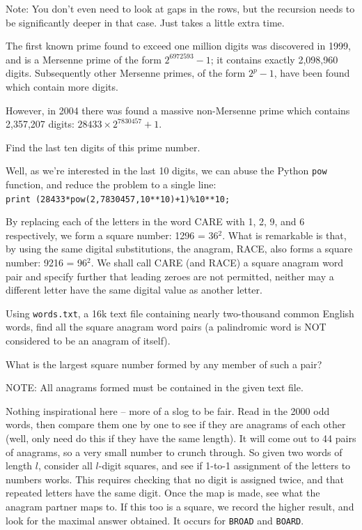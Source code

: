 \footnotesize
Note: You don't even need to look at gaps in the rows, but the recursion needs to be significantly deeper in that case.  Just takes a little extra time.

\vspace{-0.5cm}
\normalsize
{}



The first known prime found to exceed one million digits was discovered in 1999, and is a Mersenne prime of the form $2^{6972593}-1$; it contains exactly 2,098,960 digits. Subsequently other Mersenne primes, of the form $2^p-1$, have been found which contain more digits.

However, in 2004 there was found a massive non-Mersenne prime which contains 2,357,207 digits: $28433\times2^{7830457}+1$.

Find the last ten digits of this prime number.

Well, as we're interested in the last 10 digits, we can abuse the Python \verb"pow" function, and reduce the problem to a single line:\\
\verb"print (28433*pow(2,7830457,10**10)+1)%10**10;"





By replacing each of the letters in the word CARE with 1, 2, 9, and 6 respectively, we form a square number: 1296 = 36$^2$. What is remarkable is that, by using the same digital substitutions, the anagram, RACE, also forms a square number: 9216 = 96$^2$. We shall call CARE (and RACE) a square anagram word pair and specify further that leading zeroes are not permitted, neither may a different letter have the same digital value as another letter.

Using \verb"words.txt", a 16k text file containing nearly two-thousand common English words, find all the square anagram word pairs (a palindromic word is NOT considered to be an anagram of itself).

What is the largest square number formed by any member of such a pair?

\footnotesize
NOTE: All anagrams formed must be contained in the given text file.
\normalsize

Nothing inspirational here -- more of a slog to be fair.  Read in the 2000 odd words, then compare them one by one to see if they are anagrams of each other (well, only need do this if they have the same length).  It will come out to 44 pairs of anagrams, so a very small number to crunch through.  So given two words of length $l$, consider all $l$-digit squares, and see
if 1-to-1 assignment of the letters to numbers works.  This requires checking that no digit is assigned twice, and that repeated letters have the same digit.  Once the map is made, see what the anagram partner maps to.  If this too is a square, we record the higher result, and look for the maximal answer obtained.  It occurs for \verb"BROAD" and \verb"BOARD".

